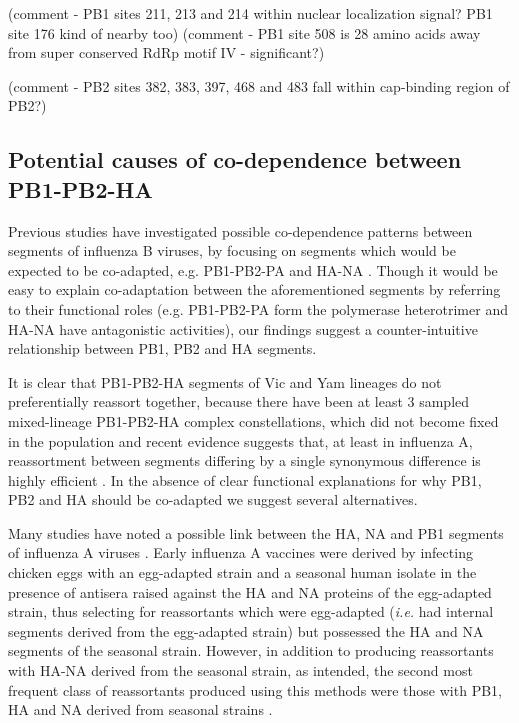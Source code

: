 \documentclass[11pt,oneside,letterpaper]{article}
\begin{document}
(comment - PB1 sites 211, 213 and 214 within nuclear localization signal? PB1 site 176 kind of nearby too)
(comment - PB1 site 508 is 28 amino acids away from super conserved RdRp motif IV - significant?)

(comment - PB2 sites 382, 383, 397, 468 and 483 fall within cap-binding region of PB2?)

\subsection*{Potential causes of co-dependence between PB1-PB2-HA}
Previous studies have investigated possible co-dependence patterns between segments of influenza B viruses, by focusing on segments which would be expected to be co-adapted, e.g. PB1-PB2-PA and HA-NA \cite{mccullers2004}.
Though it would be easy to explain co-adaptation between the aforementioned segments by referring to their functional roles (e.g. PB1-PB2-PA form the polymerase heterotrimer and HA-NA have antagonistic activities), our findings suggest a counter-intuitive relationship between PB1, PB2 and HA segments.

It is clear that PB1-PB2-HA segments of Vic and Yam lineages do not preferentially reassort together, because there have been at least 3 sampled mixed-lineage PB1-PB2-HA complex constellations, which did not become fixed in the population and recent evidence suggests that, at least in influenza A, reassortment between segments differing by a single synonymous difference is highly efficient \cite{marshall2013}.
In the absence of clear functional explanations for why PB1, PB2 and HA should be co-adapted we suggest several alternatives.

Many studies have noted a possible link between the HA, NA and PB1 segments of influenza A viruses \cite{bergeron2010,fulvini2011}.
Early influenza A vaccines were derived by infecting chicken eggs with an egg-adapted strain and a seasonal human isolate in the presence of antisera raised against the HA and NA proteins of the egg-adapted strain, thus selecting for reassortants which were egg-adapted (\textit{i.e.} had internal segments derived from the egg-adapted strain) but possessed the HA and NA segments of the seasonal strain.
However, in addition to producing reassortants with HA-NA derived from the seasonal strain, as intended, the second most frequent class of reassortants produced using this methods were those with PB1, HA and NA derived from seasonal strains \cite{bergeron2010,fulvini2011}.
\end{document}
